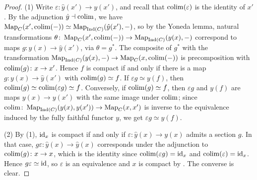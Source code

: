 	\begin{proof}
		(1) Write $\varepsilon\colon \hat{y}(x') \to y(x')$, and recall that $\operatorname{colim}(\varepsilon)$ is the identity of $x'$. By the adjunction $\hat{y} \dashv \operatorname{colim}$, we have $\operatorname{Map}_C(x',\operatorname{colim}(-)) \simeq \operatorname{Map}_{\operatorname{Ind}(C)}(\hat{y}(x'),-)$, so by the Yoneda lemma, natural transformations $\theta\colon \operatorname{Map}_C(x',\operatorname{colim}(-)) \to \operatorname{Map}_{\operatorname{Ind}(C)}(y(x),-)$ correspond to maps $g\colon y(x) \to \hat{y}(x')$, via $\theta = g^*$. The composite of $g^*$ with the transformation $\operatorname{Map}_{\operatorname{Ind}(C)}(y(x),-) \to \operatorname{Map}_C(x,\operatorname{colim}(-))$ is precomposition with $\operatorname{colim}(g)\colon x \to x'$. Hence $f$ is compact if and only if there is a map $g\colon y(x) \to \hat{y}(x')$ with $\operatorname{colim}(g) \simeq f$. If $\varepsilon g \simeq y(f)$, then $\operatorname{colim}(g) \simeq \operatorname{colim}(\varepsilon g) \simeq f$. Conversely, if $\operatorname{colim}(g) \simeq f$, then $\varepsilon g$ and $y(f)$ are maps $y(x) \to y(x')$ with the same image under $\operatorname{colim}$; since $\operatorname{colim}\colon \operatorname{Map}_{\operatorname{Ind}(C)}(y(x),y(x')) \to \operatorname{Map}_C(x,x')$ is inverse to the equivalence induced by the fully faithful functor $y$, we get $\varepsilon g \simeq y(f)$.

		(2) By (1), $\operatorname{id}_x$ is compact if and only if $\varepsilon\colon \hat{y}(x) \to y(x)$ admits a section $g$. In that case, $g\varepsilon\colon \hat{y}(x) \to \hat{y}(x)$ corresponds under the adjunction to $\operatorname{colim}(g)\colon x \to x$, which is the identity since $\operatorname{colim}(\varepsilon g) = \operatorname{id}_x$ and $\operatorname{colim}(\varepsilon) = \operatorname{id}_x$. Hence $g\varepsilon \simeq \operatorname{id}$, so $\varepsilon$ is an equivalence and $x$ is compact by . The converse is clear.
	\end{proof}


